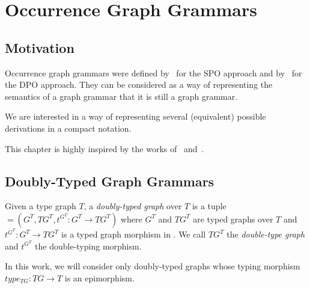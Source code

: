 \chapter{Occurrence Graph Grammars}

\section{Motivation}

Occurrence graph grammars were defined by~\cite{Ribeiro1996} for the SPO approach and by~\cite{Corradini1996} for the DPO approach. They can be considered as a way of representing the  semantics of a graph grammar that it is still a graph grammar.

We are interested in a way of representing several (equivalent) possible derivations in a compact notation.

  This chapter is highly inspired by the works of~\cite{Ribeiro1996} and~\cite{Corradini1996}.

\section{Doubly-Typed Graph Grammars}

\begin{definition} Given a type graph $T$, a \emph{doubly-typed graph} \doublyTypedGraph{} over $T$ is a tuple \doublyTypedGraph $= \left(G^T,TG^T, t^{G^T} : G^T \rightarrow TG^T\right)$ where $G^T$ and $TG^T$ are typed graphs over $T$ and \mbox{$t^{G^T} : G^T \rightarrow TG^T$} is a typed graph morphism in \typedGraphCategory{}. We call $TG^T$ the \emph{double-type graph} and $t^{G^T}$ the double-typing morphism.
\end{definition}

\begin{remark} In this work, we will consider only doubly-typed graphs whose typing morphism $type_{TG} : TG \rightarrow T$ is an epimorphism. 
\end{remark}

